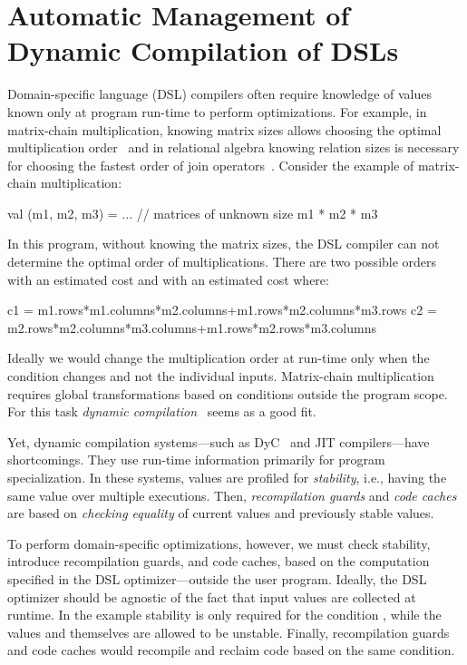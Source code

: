 \chapter{Automatic Management of Dynamic Compilation of DSLs }
\label{sec:dynamic-compilation}

Domain-specific language (DSL) compilers often require knowledge of values known only
 at program run-time to perform optimizations. For example,
 in matrix-chain multiplication, knowing matrix sizes allows choosing the
 optimal multiplication order~\cite[Ch.~15.2]{cormen2001introduction} and
 in relational algebra knowing relation sizes is necessary for choosing
 the fastest order of join operators~\cite{selinger1979access}. Consider the example
 of matrix-chain multiplication:\begin{lstparagraph}
  val (m1, m2, m3) = ... // matrices of unknown size
  m1 * m2 * m3
\end{lstparagraph}

In this program, without knowing the matrix sizes, the DSL compiler can not determine the
 optimal order of multiplications. There are two possible orders
  with an estimated cost  and  with an estimated cost  where:\begin{lstparagraph}
  c1 = m1.rows*m1.columns*m2.columns+m1.rows*m2.columns*m3.rows
  c2 = m2.rows*m2.columns*m3.columns+m1.rows*m2.rows*m3.columns
\end{lstparagraph}

Ideally we would change the multiplication order at run-time only when the condition
  changes and not the individual inputs. Matrix-chain multiplication
 requires global transformations based on conditions outside the program scope.
 For this task \emph{dynamic compilation}~\cite{auslander1996fast} seems as a good fit.

Yet, dynamic compilation systems---such as DyC~\cite{grant2000dyc} and JIT compilers---have shortcomings.
 They use run-time information primarily for program specialization. In these systems,
 values are profiled for \emph{stability}, i.e., having the same value over multiple executions.
 Then, \emph{recompilation guards} and \emph{code caches} are based on \emph{checking equality}
 of current values and previously stable values.

 To perform domain-specific optimizations, however, we must check stability, introduce recompilation guards,
  and code caches, based on the computation specified in the DSL optimizer---outside the user program.
  Ideally, the DSL optimizer should be agnostic of the fact that input values
  are collected at runtime. In the example stability is only required for the condition , while the values
   and  themselves are allowed to be unstable. Finally, recompilation guards
  and code caches would recompile and reclaim code based on the same condition.

